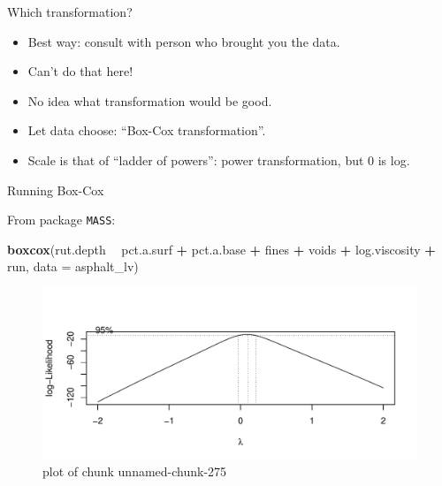 \documentclass[ignorenonframetext,]{beamer}
\newenvironment{Shaded}{\begin{snugshade}}{\end{snugshade}}
\newcommand{\DataTypeTok}[1]{\textcolor[rgb]{0.13,0.29,0.53}{#1}}
\newcommand{\KeywordTok}[1]{\textcolor[rgb]{0.13,0.29,0.53}{\textbf{#1}}}
\newcommand{\NormalTok}[1]{#1}
\newcommand{\OperatorTok}[1]{\textcolor[rgb]{0.81,0.36,0.00}{\textbf{#1}}}
\newcommand{\StringTok}[1]{\textcolor[rgb]{0.31,0.60,0.02}{#1}}
\providecommand{\tightlist}{%
  \setlength{\itemsep}{0pt}\setlength{\parskip}{0pt}}
\begin{document}
\begin{frame}{Which transformation?}
\protect\hypertarget{which-transformation}{}

\begin{itemize}
\tightlist
\item
  Best way: consult with person who brought you the data.
\item
  Can't do that here!
\item
  No idea what transformation would be good.
\item
  Let data choose: ``Box-Cox transformation''.
\item
  Scale is that of ``ladder of powers'': power transformation, but 0 is
  log.
\end{itemize}

\end{frame}

\begin{frame}[fragile]{Running Box-Cox}
\protect\hypertarget{running-box-cox}{}

From package \texttt{MASS}:

\begin{Shaded}
\begin{Highlighting}[]
\KeywordTok{boxcox}\NormalTok{(rut.depth }\OperatorTok{~}\StringTok{ }\NormalTok{pct.a.surf }\OperatorTok{+}\StringTok{ }\NormalTok{pct.a.base }\OperatorTok{+}\StringTok{ }\NormalTok{fines }\OperatorTok{+}\StringTok{ }\NormalTok{voids }\OperatorTok{+}
\StringTok{  }\NormalTok{log.viscosity }\OperatorTok{+}\StringTok{ }\NormalTok{run, }\DataTypeTok{data =}\NormalTok{ asphalt_lv)}
\end{Highlighting}
\end{Shaded}

\begin{figure}
\centering
\includegraphics{figure/unnamed-chunk-275-1.pdf}
\caption{plot of chunk unnamed-chunk-275}
\end{figure}

\end{frame}
\end{document}
